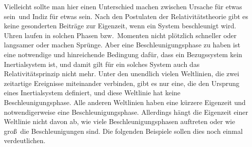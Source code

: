 Vielleicht sollte man hier einen Unterschied machen zwischen \glqq Ursache f\"ur etwas sein\grqq\ 
und \glqq Indiz f\"ur etwas sein\grqq. Nach den Postulaten der Relativit\"atstheorie
gibt es keine gesonderten 
Beitr\"age zur Eigenzeit, wenn ein Sys\-tem beschleunigt wird. Uhren laufen in solchen Phasen 
bzw.\ Momenten nicht 
pl\"otzlich schneller oder langsamer oder machen Spr\"unge. Aber eine Beschleunigungsphase zu haben
ist eine notwendige und hinreichende Bedingung daf\"ur, dass ein Bezugssystem kein Inertial\-sys\-tem
ist, und damit gilt f\"ur ein solches System auch das Relativit\"atsprinzip nicht mehr. Unter den 
unendlich vielen Weltlinien, die zwei zeitartige Ereignisse miteinander verbinden, gibt es nur eine,
die den Ursprung eines Inertialsystem definiert, und diese Weltlinie hat keine Beschleunigungsphase.
Alle anderen Weltlinien haben eine k\"urzere Eigenzeit und notwendigerweise eine Beschleunigungsphase.
Allerdings h\"angt die Eigenzeit einer Weltlinie nicht davon ab, wie viele Beschleunigungsphasen 
auftreten oder wie gro\ss\ die Beschleunigungen sind. Die folgenden Beispiele sollen dies
noch einmal verdeutlichen. 


